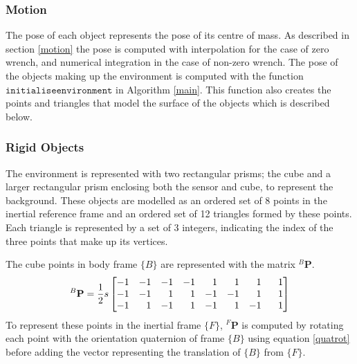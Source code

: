 \subsubsection{Motion}
The pose of each object represents the pose of its centre of mass. As described in section \ref{motion} the pose is computed with interpolation for the case of zero wrench, and numerical integration in the case of non-zero wrench. The pose of the objects making up the environment is computed with the function $\texttt{initialiseenvironment}$ in Algorithm \ref{main}. This function also creates the points and triangles that model the surface of the objects which is described below.

\subsubsection{Rigid Objects}
The environment is represented with two rectangular prisms; the cube and a larger rectangular prism enclosing both the sensor and cube, to represent the background. These objects are modelled as an ordered set of 8 points in the inertial reference frame and an ordered set of 12 triangles formed by these points. Each triangle is represented by a set of 3 integers, indicating the index of the three points that make up its vertices.

The cube points in body frame $\{B\}$ are represented with the matrix ${^{B}\mathbf{P}}$.
\begin{equation}
	{^{B}\mathbf{P}} = \frac{1}{2}s
	\begin{bmatrix*}[r]
		-1  &  -1  &  -1  &  -1  &   1  &   1  &   1  &  \hspace{0.75em} 1 \\
		-1  &  -1  &   1  &   1  &  -1  &  -1  &   1  &  1 \\
		-1  &   1  &  -1  &   1  &  -1  &   1  &  -1  &  1 
	\end{bmatrix*}
\end{equation}
To represent these points in the inertial frame $\{F\}$, ${^{F}\mathbf{P}}$ is computed by rotating each point with the orientation quaternion of frame $\{B\}$ using equation \ref{quatrot} before adding the vector representing the translation of $\{B\}$ from $\{F\}$.

